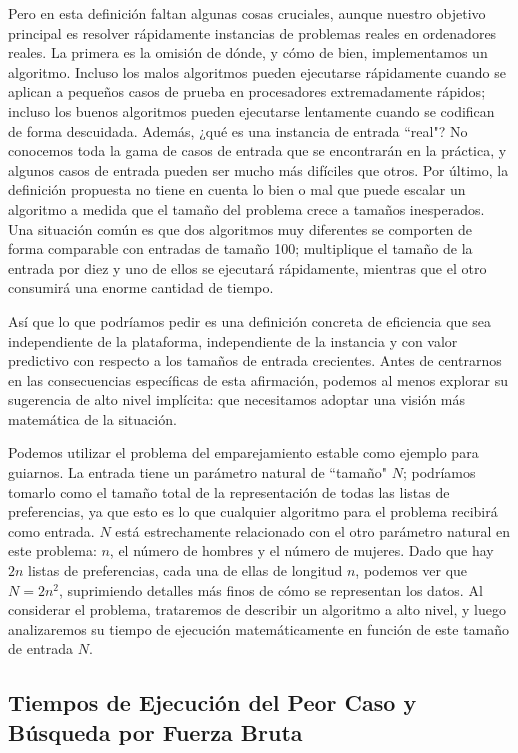 \documentclass[a4paper, 12pt]{book}
\begin{document}
Pero en esta definición faltan algunas cosas cruciales, aunque nuestro
objetivo principal es resolver rápidamente instancias de problemas reales en ordenadores reales. La primera es la omisión de dónde, y cómo de bien, implementamos un algoritmo. Incluso los malos algoritmos pueden ejecutarse rápidamente cuando se aplican a pequeños casos de prueba en procesadores extremadamente rápidos; incluso los buenos algoritmos pueden ejecutarse lentamente cuando se codifican de forma descuidada.
Además, ¿qué es una instancia de entrada ``real"?
No conocemos toda la gama de casos de entrada que se encontrarán en la práctica, y algunos casos de entrada pueden ser mucho más difíciles que otros. 
Por último, la definición propuesta no tiene en cuenta lo bien o mal que puede escalar un algoritmo a medida que el tamaño del problema crece
a tamaños inesperados. Una situación común es que dos algoritmos muy diferentes se comporten de forma comparable con entradas de tamaño 100; multiplique el tamaño de la entrada por diez y uno de ellos se ejecutará rápidamente, mientras que el otro consumirá una enorme cantidad de tiempo.

Así que lo que podríamos pedir es una definición concreta de eficiencia que sea independiente de la plataforma, independiente de la instancia y con valor predictivo con respecto a los tamaños de entrada crecientes. Antes de centrarnos en las consecuencias específicas de esta afirmación, podemos al menos explorar su sugerencia de alto nivel implícita: que necesitamos adoptar una visión más matemática de la situación.

Podemos utilizar el problema del emparejamiento estable como ejemplo para guiarnos. La entrada tiene un parámetro natural de ``tamaño" $N$; podríamos tomarlo como el tamaño total de la representación de todas las listas de preferencias, ya que esto es lo que cualquier algoritmo para el problema recibirá como entrada. $N$ está estrechamente relacionado con el otro parámetro natural en este problema: $n$, el número de hombres y el número de mujeres. Dado que hay $2n$ listas de preferencias, cada una de ellas de longitud $n$, podemos ver que $N = 2n^2$, suprimiendo detalles más finos de cómo se representan los datos. Al considerar el problema, trataremos de describir un algoritmo a alto nivel, y luego analizaremos su tiempo de ejecución matemáticamente en función de este tamaño de entrada $N$.


\subsection*{Tiempos de Ejecución del Peor Caso y Búsqueda por Fuerza Bruta} 
\end{document}
